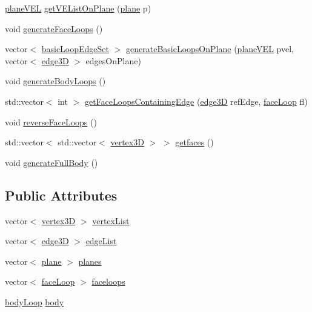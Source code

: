 \begin{DoxyCompactItemize}
\item 
\mbox{\hyperlink{structplane_v_e_l}{plane\+V\+EL}} \mbox{\hyperlink{classwire_frame_acdcde71a2d420de040065d6db4ad334d}{get\+V\+E\+List\+On\+Plane}} (\mbox{\hyperlink{structplane}{plane}} p)
\item 
void \mbox{\hyperlink{classwire_frame_ac5c8d8c3b1b5f693ad46cb54aae1108a}{generate\+Face\+Loops}} ()
\item 
vector$<$ \mbox{\hyperlink{classbasic_loop_edge_set}{basic\+Loop\+Edge\+Set}} $>$ \mbox{\hyperlink{classwire_frame_ad570a0e37cc761e789d101904c64ef1a}{generate\+Basic\+Loops\+On\+Plane}} (\mbox{\hyperlink{structplane_v_e_l}{plane\+V\+EL}} pvel, vector$<$ \mbox{\hyperlink{structedge3_d}{edge3D}} $>$ edges\+On\+Plane)
\item 
void \mbox{\hyperlink{classwire_frame_a114f0cea254a8845bf5e999503dfcdec}{generate\+Body\+Loops}} ()
\item 
std\+::vector$<$ int $>$ \mbox{\hyperlink{classwire_frame_aff23ae34c3bab0a3a4b6967e4b955ecb}{get\+Face\+Loops\+Containing\+Edge}} (\mbox{\hyperlink{structedge3_d}{edge3D}} ref\+Edge, \mbox{\hyperlink{classface_loop}{face\+Loop}} fl)
\item 
void \mbox{\hyperlink{classwire_frame_a4a14c6a4043acfaba2a7122daaf925e6}{reverse\+Face\+Loops}} ()
\item 
std\+::vector$<$ std\+::vector$<$ \mbox{\hyperlink{structvertex3_d}{vertex3D}} $>$ $>$ \mbox{\hyperlink{classwire_frame_a1abdffd7d1d696252685617b63a4126c}{getfaces}} ()
\item 
void \mbox{\hyperlink{classwire_frame_a66a5ed6072911c6746366c6cadee7f36}{generate\+Full\+Body}} ()
\end{DoxyCompactItemize}
\subsection*{Public Attributes}
\begin{DoxyCompactItemize}
\item 
vector$<$ \mbox{\hyperlink{structvertex3_d}{vertex3D}} $>$ \mbox{\hyperlink{classwire_frame_aa70e800c97cd01d6ae3e93246a5cbae7}{vertex\+List}}
\item 
vector$<$ \mbox{\hyperlink{structedge3_d}{edge3D}} $>$ \mbox{\hyperlink{classwire_frame_af9b75331150dbb28588ae24a8d6ecf52}{edge\+List}}
\item 
vector$<$ \mbox{\hyperlink{structplane}{plane}} $>$ \mbox{\hyperlink{classwire_frame_aa1e3ca4f8822ffc02447f9ba92542698}{planes}}
\item 
vector$<$ \mbox{\hyperlink{classface_loop}{face\+Loop}} $>$ \mbox{\hyperlink{classwire_frame_a443c6e0a6695cd71527edfeff03ae7e6}{faceloops}}
\item 
\mbox{\hyperlink{classbody_loop}{body\+Loop}} \mbox{\hyperlink{classwire_frame_a21133365b1a54c197741351a16a4e061}{body}}
\end{DoxyCompactItemize}


